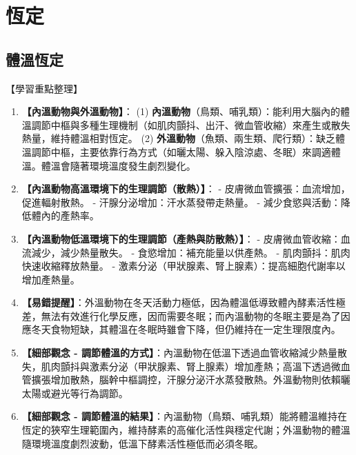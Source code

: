 \documentclass[11pt,a4paper]{article}
\begin{document}
\newpage
\section{恆定}
\subsection{體溫恆定}
\begin{learningpoints}{【學習重點整理】}
\begin{enumerate}[label=\arabic*.]
  \item \textbf{【內溫動物與外溫動物】}：
  (1) \textbf{內溫動物}（鳥類、哺乳類）：能利用大腦內的體溫調節中樞與多種生理機制（如肌肉顫抖、出汗、微血管收縮）來產生或散失熱量，維持體溫相對恆定。
  (2) \textbf{外溫動物}（魚類、兩生類、爬行類）：缺乏體溫調節中樞，主要依靠行為方式（如曬太陽、躲入陰涼處、冬眠）來調適體溫。體溫會隨著環境溫度發生劇烈變化。
  \item \textbf{【內溫動物高溫環境下的生理調節（散熱）】}：
  - 皮膚微血管擴張：血流增加，促進輻射散熱。
  - 汗腺分泌增加：汗水蒸發帶走熱量。
  - 減少食慾與活動：降低體內的產熱率。
  \item \textbf{【內溫動物低溫環境下的生理調節（產熱與防散熱）】}：
  - 皮膚微血管收縮：血流減少，減少熱量散失。
  - 食慾增加：補充能量以供產熱。
  - 肌肉顫抖：肌肉快速收縮釋放熱量。
  - 激素分泌（甲狀腺素、腎上腺素）：提高細胞代謝率以增加產熱量。
  \item \textbf{【易錯提醒】}：外溫動物在冬天活動力極低，因為體溫低導致體內酵素活性極差，無法有效進行化學反應，因而需要冬眠；而內溫動物的冬眠主要是為了因應冬天食物短缺，其體溫在冬眠時雖會下降，但仍維持在一定生理限度內。
  \item \textbf{【細部觀念 - 調節體溫的方式】}：內溫動物在低溫下透過血管收縮減少熱量散失，肌肉顫抖與激素分泌（甲狀腺素、腎上腺素）增加產熱；高溫下透過微血管擴張增加散熱，腦幹中樞調控，汗腺分泌汗水蒸發散熱。外溫動物則依賴曬太陽或避光等行為調節。
  \item \textbf{【細部觀念 - 調節體溫的結果】}：內溫動物（鳥類、哺乳類）能將體溫維持在恆定的狹窄生理範圍內，維持酵素的高催化活性與穩定代謝；外溫動物的體溫隨環境溫度劇烈波動，低溫下酵素活性極低而必須冬眠。
\end{enumerate}
\end{learningpoints}
\end{document}
